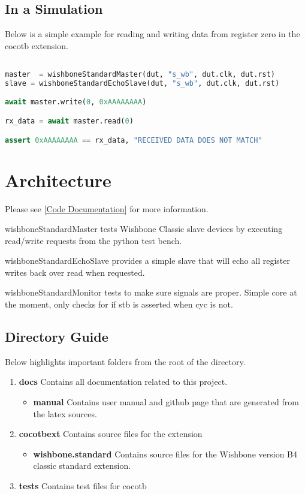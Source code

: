 \subsection{In a Simulation}
\par
Below is a simple example for reading and writing data from register zero in the cocotb extension.
\begin{lstlisting}[language=Python]

master  = wishboneStandardMaster(dut, "s_wb", dut.clk, dut.rst)
slave = wishboneStandardEchoSlave(dut, "s_wb", dut.clk, dut.rst)

await master.write(0, 0xAAAAAAAA)

rx_data = await master.read(0)

assert 0xAAAAAAAA == rx_data, "RECEIVED DATA DOES NOT MATCH"

\end{lstlisting}

\section{Architecture}

Please see \ref{Code Documentation} for more information.

\par
wishboneStandardMaster tests Wishbone Classic slave devices by executing read/write requests from the python test bench.
\par
wishboneStandardEchoSlave provides a simple slave that will echo all register writes back over read when requested.
\par
wishboneStandardMonitor tests to make sure signals are proper. Simple core at the moment, only checks for if stb is
asserted when cyc is not.

\subsection{Directory Guide}

\par
Below highlights important folders from the root of the directory.

\begin{enumerate}
  \item \textbf{docs} Contains all documentation related to this project.
    \begin{itemize}
      \item \textbf{manual} Contains user manual and github page that are generated from the latex sources.
    \end{itemize}
  \item \textbf{cocotbext} Contains source files for the extension
    \begin{itemize}
      \item \textbf{wishbone.standard} Contains source files for the Wishbone version B4 classic standard extension.
    \end{itemize}
  \item \textbf{tests} Contains test files for cocotb
\end{enumerate}

